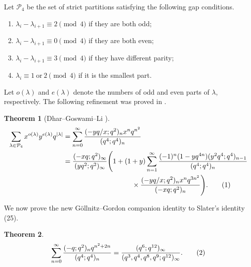 \documentclass[11pt]{amsart}
\newtheorem{theorem}{Theorem}[section]
\theoremstyle{definition}
\theoremstyle{remark}
\numberwithin{equation}{section}
\newcommand\numberthis{\addtocounter{equation}{1}\tag{\theequation}}
\begin{document}
Let $\mathcal{P}_4$ be the set of strict partitions satisfying the following gap conditions.
\begin{enumerate}
    \item $\lambda_i-\lambda_{i+1}\equiv 2\pmod{4}$ if they are both odd;
    \item $\lambda_i-\lambda_{i+1}\equiv 0\pmod{4}$ if they are both even;
    \item $\lambda_{i}-\lambda_{i+1}\equiv 3\pmod{4}$ if they have different parity;
    \item $\lambda_{i}\equiv 1\ \text{or}\ 2\pmod{4}$ if it is the smallest part.
\end{enumerate}
Let $o(\lambda)$ and $e(\lambda)$ denote the numbers of odd and even parts of $\lambda$, respectively. The following refinement was proved in \cite{DGLSIPI}.
\begin{theorem}[Dhar--Goswami--Li \cite{DGLSIPI}]\label{thm:P4Gen}
\begin{align*}
\sum_{\lambda\in\mathcal{P}_4}x^{o(\lambda)}y^{e(\lambda)}q^{|\lambda|} &= \sum_{n=0}^{\infty}\frac{(-yq/x;q^2)_{n}x^{n}q^{n^2}}{(q^4;q^4)_{n}}\\
&= \frac{(-xq;q^2)_{\infty}}{(yq^2;q^2)_{\infty}}
\Biggl(1+(1+y)\sum_{n=1}^{\infty}
\frac{(-1)^n(1-yq^{4n})(y^2q^4;q^4)_{n-1}}{(q^4;q^4)_n}\\
&\hspace{3.5cm}\times
\frac{(-yq/x;q^2)_n x^n q^{3n^2}}{(-xq;q^2)_n}\Biggr).
\numberthis\label{eq:P4eq1}
\end{align*}
\end{theorem}
We now prove the new G\"ollnitz--Gordon companion identity to Slater's identity (25).
\begin{theorem}
\begin{align*}
\sum_{n=0}^{\infty}\frac{(-q;q^2)_{n}q^{n^2+2n}}{(q^4;q^4)_{n}}=\frac{(q^6;q^{12})_{\infty}}{(q^3,q^4,q^8,q^9;q^{12})_{\infty}}.\numberthis\label{eq:P4eq2}
\end{align*}
\end{theorem}
\end{document}
